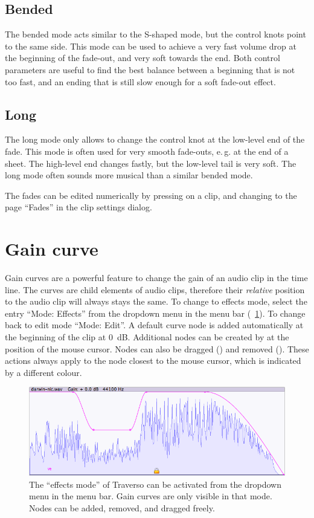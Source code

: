 \subsection{Bended}
The bended mode acts similar to the S-shaped mode, but the control knots point to the same side. This mode can be used to achieve a very fast volume drop at the beginning of the fade-out, and very soft towards the end. Both control parameters are useful to find the best balance between a beginning that is not too fast, and an ending that is still slow enough for a soft fade-out effect.

\subsection{Long}
The long mode only allows to change the control knot at the low-level end of the fade. This mode is often used for very smooth fade-outs, e.\,g. at the end of a sheet. The high-level end changes fastly, but the low-level tail is very soft. The long mode often sounds more musical than a similar bended mode.

The fades can be edited numerically by pressing  on a clip, and changing to the page ``Fades'' in the clip settings dialog.

\section{Gain curve}
Gain curves are a powerful feature to change the gain of an audio clip in the time line. The curves are child elements of audio clips, therefore their \emph{relative} position to the audio clip will always stays the same. To change to effects mode, select the entry ``Mode: Effects'' from the dropdown menu in the menu bar (\FigB~\ref{fig_gcurve01}). To change back to edit mode ``Mode: Edit''. A default curve node is added automatically at the beginning of the clip at 0~dB. Additional nodes can be created by  at the position of the mouse cursor. Nodes can also be dragged () and removed (). These actions always apply to the node closest to the mouse cursor, which is indicated by a different colour.

\begin{figure}[t]
 \centering\includegraphics[width=\textwidth]{../images/gcurve01}
 \caption{The ``effects mode'' of Traverso can be activated from the dropdown menu in the menu bar. Gain curves are only visible in that mode. Nodes can be added, removed, and dragged freely.}
 \label{fig_gcurve01}
\end{figure}

